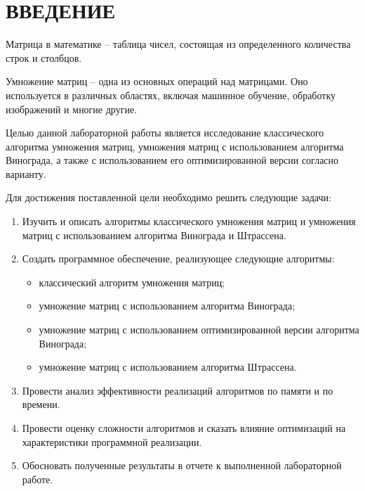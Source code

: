 \chapter*{ВВЕДЕНИЕ}

Матрица в математике -- таблица чисел, состоящая из определенного количества строк и столбцов.

Умножение матриц -- одна из основных операций над матрицами. Оно используется в различных областях, включая машинное обучение, обработку изображений и многие другие.

Целью данной лабораторной работы является исследование классического алгоритма умножения матриц, умножения матриц с использованием алгоритма Винограда, а также с использованием его оптимизированной версии согласно варианту.

Для достижения поставленной цели необходимо решить следующие задачи:

\begin{enumerate}[label={\arabic*)}]
	\item Изучить и описать алгоритмы классического умножения матриц и умножения матриц с использованием алгоритма Винограда и Штрассена.
	\item Создать программное обеспечение, реализующее следующие алгоритмы:
	\begin{itemize}[label=--]
		\item классический алгоритм умножения матриц;
		\item умножение матриц с использованием алгоритма Винограда;
		\item умножение матриц с использованием оптимизированной версии алгоритма Винограда;
		\item умножение матриц с использованием алгоритма Штрассена.
	\end{itemize}

	\item Провести анализ эффективности реализаций алгоритмов по памяти и по времени.
	\item Провести оценку сложности алгоритмов и сказать влияние оптимизаций на характеристики программной реализации.
	\item Обосновать полученные результаты в отчете к выполненной лабораторной работе.
\end{enumerate}
